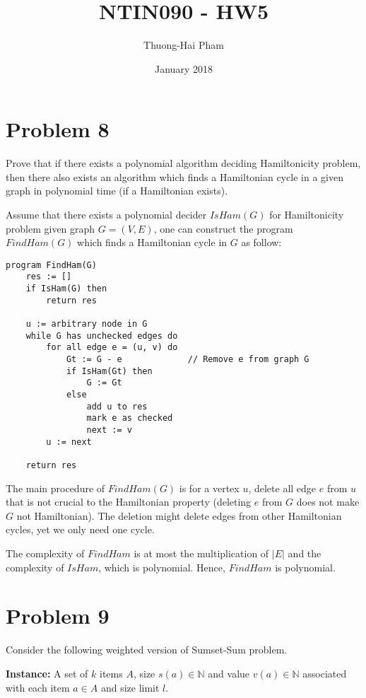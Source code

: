 \documentclass{article}
\title{NTIN090 - HW5}
\author{Thuong-Hai Pham}
\date{January 2018}
\begin{document}
\maketitle

\section{Problem 8}

Prove that if there exists a polynomial algorithm deciding Hamiltonicity problem, then there
also exists an algorithm which finds a Hamiltonian cycle in a given graph in polynomial time (if a Hamiltonian
exists).

Assume that there exists a polynomial decider $IsHam(G)$ for Hamiltonicity problem given graph $G=(V,E)$, one can construct the program $FindHam(G)$ which finds a Hamiltonian cycle in $G$ as follow:

\begin{verbatim}
program FindHam(G)
    res := []
    if IsHam(G) then
        return res

    u := arbitrary node in G
    while G has unchecked edges do
        for all edge e = (u, v) do
            Gt := G - e             // Remove e from graph G
            if IsHam(Gt) then
                G := Gt
            else
                add u to res
                mark e as checked
                next := v
        u := next
        
    return res
\end{verbatim}

The main procedure of $FindHam(G)$ is for a vertex $u$, delete all edge $e$ from $u$ that is not crucial to the Hamiltonian property (deleting $e$ from $G$ does not make $G$ not Hamiltonian). The deletion might delete edges from other Hamiltonian cycles, yet we only need one cycle.

The complexity of $FindHam$ is at most the multiplication of $|E|$ and the complexity of $IsHam$, which is polynomial. Hence, $FindHam$ is polynomial.


\section{Problem 9}

Consider the following weighted version of Sumset-Sum problem.

\textbf{Instance:} A set of $k$ items $A$, size $s(a)\in \mathbb{N}$ and value $v(a)\in \mathbb{N}$ associated with each item $a\in A$ and size
limit $l$.
\end{document}
